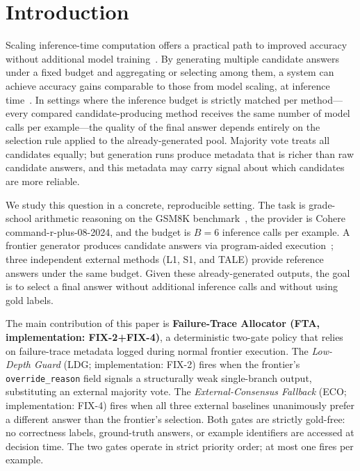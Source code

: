 \section{Introduction}
\label{sec:introduction}

Scaling inference-time computation offers a practical path to improved accuracy
without additional model training~\citep{snell2024scaling}.
By generating multiple candidate answers under a fixed budget and aggregating or
selecting among them, a system can achieve accuracy gains comparable to those from
model scaling, at inference time~\citep{wang2023self}.
In settings where the inference budget is strictly matched per method---every compared
candidate-producing method receives the same number of model calls per example---the
quality of the final answer depends entirely on the selection rule applied to the
already-generated pool.
Majority vote treats all candidates equally; but generation runs produce metadata
that is richer than raw candidate answers, and this metadata may carry signal about
which candidates are more reliable.

We study this question in a concrete, reproducible setting.
The task is grade-school arithmetic reasoning on the GSM8K
benchmark~\citep{cobbe2021training}, the provider is Cohere command-r-plus-08-2024,
and the budget is $B = 6$ inference calls per example.
A frontier generator produces candidate answers via program-aided
execution~\citep{gao2023pal}; three independent external methods (L1, S1, and TALE)
provide reference answers under the same budget.
Given these already-generated outputs, the goal is to select a final answer without
additional inference calls and without using gold labels.

The main contribution of this paper is \textbf{Failure-Trace Allocator (FTA, implementation: FIX-2+FIX-4)},
a deterministic two-gate policy that relies on
failure-trace metadata logged during normal frontier execution.
The \textit{Low-Depth Guard} (LDG; implementation: FIX-2) fires when the frontier's
\texttt{override\_reason} field signals a structurally weak single-branch output,
substituting an external majority vote.
The \textit{External-Consensus Fallback} (ECO; implementation: FIX-4) fires when all three external
baselines unanimously prefer a different answer than the frontier's selection.
Both gates are strictly gold-free: no correctness labels, ground-truth answers, or
example identifiers are accessed at decision time.
The two gates operate in strict priority order; at most one fires per example.

